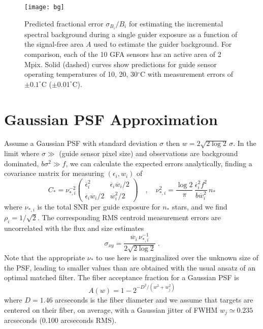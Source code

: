 \documentclass[11pt]{article}
\begin{document}
\begin{figure}[htb]
\begin{center}
\texttt{[image: bg]}
\caption{Predicted fractional error $\sigma_{B_i}/B_i$ for estimating the incremental spectral background during a single guider exposure as a function of the signal-free area $A$ used to estimate the guider background. For comparison, each of the 10 GFA sensors has an active area of 2 Mpix. Solid (dashed) curves show predictions for guide sensor operating temperatures of 10, 20, 30$^\circ$C with measurement errors of $\pm0.1^\circ$C ($\pm 0.01^\circ$C).}
\label{fig:bgpar}
\end{center}
\end{figure}

\section{Gaussian PSF Approximation}

Assume a Gaussian PSF with standard deviation $\sigma$ then $w = 2\sqrt{2\log 2}\,\sigma$. In the limit where $\sigma \gg$ (guide sensor pixel size) and observations are background dominated, $b \sigma^2 \gg f$, we can calculate the expected errors analytically, finding a covariance matrix for measuring $(\epsilon_i,w_i)$ of
\begin{equation}
C_{\ast} = \nu_{\ast,i}^{-2}\begin{pmatrix}
\overline{\epsilon}_i^2 & \overline{\epsilon}_i \overline{w}_i/2\\
\overline{\epsilon}_i \overline{w}_i/2 & \overline{w}_i^2/2
\end{pmatrix}\quad, \quad
\nu_{\ast,i}^2 = \frac{\log 2}{\pi}\, \frac{\overline{\epsilon}_i^2 f^2}{b \overline{w}_i^2}\, n_{\ast}
\end{equation}
where $\nu_{\ast,i}$ is the total SNR per guide exposure for $n_{\ast}$ stars, and we find $\rho_i = 1/\sqrt{2}$. The corresponding RMS centroid measurement errors are uncorrelated with the flux and size estimates
\begin{equation}
\sigma_{xy} = \frac{\overline{w}_i\,\nu_{\ast,i}^{-1}}{2\sqrt{2\log 2}} \; .
\end{equation}
Note that the appropriate $\nu_\ast$ to use here is marginalized over the unknown size of the PSF, leading to smaller values than are obtained with the usual ansatz of an optimal matched filter. The fiber acceptance fraction for a Gaussian PSF is
\begin{equation}
A(w) = 1 - 2^{-D^2/(w^2+w_j^2)}
\end{equation}
where $D = 1.46$ arcseconds is the fiber diameter and we assume that targets are centered on their fiber, on average, with a Gaussian jitter of FWHM $w_j \simeq 0.235$ arcseconds (0.100 arcseconds RMS).
\end{document}
